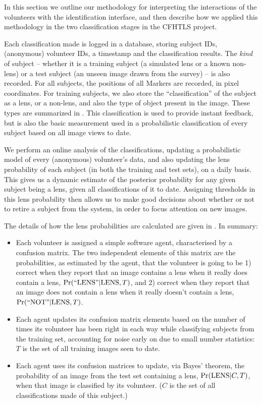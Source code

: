 \documentclass[useAMS,usenatbib,a4paper]{mn2e}
\begin{document}
In this section we outline our methodology for interpreting the interactions
of the volunteers with the identification interface, and then describe how we
applied this methodology in the two classification stages in the CFHTLS
project.

Each classification made is logged in a database, storing subject IDs,
(anonymous) volunteer IDs, a timestamp and the classification results.  The
{\it kind} of subject -- whether it is a training subject (a  simulated lens
or a known non-lens) or a test subject (an unseen image drawn from the survey)
-- is also recorded. For all subjects, the positions of all Markers are
recorded, in pixel coordinates. For training subjects, we also store the
``classification'' of the subject as a lens, or a non-lens, and also the type
of object present in the image. These types are summarized in
.  This classification is used to provide instant
feedback, but is also the basic measurement used in a probabilistic
classification of every subject based on all image views to date.

We perform an online analysis of the classifications,  updating a
probabilistic model of every (anonymous) volunteer's data, and also updating
the lens probability of each subject  (in both the training and test sets), on
a daily basis. This gives us a dynamic estimate of the posterior probability
for  any given  subject being a lens, given all classifications of it to date.
Assigning thresholds in this lens probability then allows us to make good
decisions about whether or not to retire a subject from the system, in order to
focus attention on new images. 

The details of how the lens probabilities are calculated are given in
. In summary:
\begin{itemize}

\item Each volunteer is assigned a simple software agent, characterised by a
confusion matrix. The two independent elements of this matrix are the
probabilities, as estimated by the agent, that the volunteer is going to be 1)
correct when they report that an image contains a lens when it really does
contain a lens, ${\rm Pr}({\rm ``LENS"}|{\rm LENS},T)$, and 2) correct when they report that
an image does not contain a lens when it really doesn't contain a lens,
${\rm Pr}({\rm ``NOT"}|{\rm LENS},T)$.

\item Each agent updates its confusion matrix elements based on the number of
times its volunteer has been right in each way while classifying subjects from
the training set, accounting for noise early on due to small number
statistics: $T$ is the set of all training images seen to date.

\item Each agent uses its confusion matrices to update, via Bayes' theorem,
the probability of an image from the test set containing a lens,
${\rm Pr}({\rm LENS}|C,T)$, when that image is classified by its volunteer. ($C$ is the
set of all classifications made of this subject.)

\end{itemize}
\end{document}
